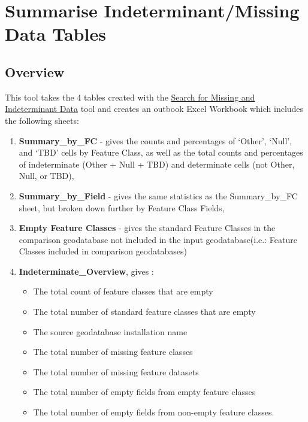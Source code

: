 \documentclass[openany]{book}
\providecommand{\tightlist}{%
  \setlength{\itemsep}{0pt}\setlength{\parskip}{0pt}}
\theoremstyle{definition}
\theoremstyle{definition}
\theoremstyle{definition}
\theoremstyle{remark}
\begin{document}
\hypertarget{summIndt}{\chapter{Summarise Indeterminant/Missing Data
Tables}\label{summIndt}}

\section{Overview}\label{overview-8}

This tool takes the 4 tables created with the
\protect\hyperlink{indtSearch}{Search for Missing and Indeterminant
Data} tool and creates an outbook Excel Workbook which includes the
following sheets:

\begin{enumerate}
\def\labelenumi{\arabic{enumi}.}
\tightlist
\item
  \textbf{Summary\_by\_FC} - gives the counts and percentages of
  `Other', `Null', and `TBD' cells by Feature Class, as well as the
  total counts and percentages of indeterminate (Other + Null + TBD) and
  determinate cells (not Other, Null, or TBD),
\item
  \textbf{Summary\_by\_Field} - gives the same statistics as the
  Summary\_by\_FC sheet, but broken down further by Feature Class
  Fields,
\item
  \textbf{Empty Feature Classes} - gives the standard Feature Classes in
  the comparison geodatabase not included in the input geodatabase(i.e.:
  Feature Classes included in comparison geodatabases)
\item
  \textbf{Indeterminate\_Overview}, gives :

  \begin{itemize}
  \tightlist
  \item
    The total count of feature classes that are empty
  \item
    The total number of standard feature classes that are empty
  \item
    The source geodatabase installation name
  \item
    The total number of missing feature classes
  \item
    The total number of missing feature datasets
  \item
    The total number of empty fields from empty feature classes
  \item
    The total number of empty fields from non-empty feature classes.
  \end{itemize}
\end{enumerate}
\end{document}

